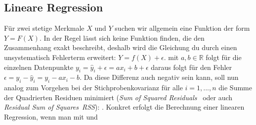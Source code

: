 \subsection{Lineare Regression}
Für zwei stetige Merkmale $X$ und $Y$ suchen wir allgemein eine Funktion der form $Y = F(X)$. In der Regel lässt sich keine Funktion finden, die den Zusammenhang exakt beschreibt, deshalb wird die Gleichung du durch einen unsystematisch Fehlerterm erweitert: $Y = f(X) + \epsilon$. mit $a, b \in \mathds{R}$ folgt für die einzelnen Datenpunkte $y_i = \hat{y}_i + \epsilon = ax_i + b + \epsilon$ daraus folgt für den Fehler $\epsilon = y_i - \hat{y}_i = y_i - ax_i - b$. Da diese Differenz auch negativ sein kann, soll nun analog zum Vorgehen bei der Stichprobenkovarianz für alle $i = 1, ..., n$ die Summe der Quadrierten Residuen minimiert (\glqq \emph{Sum of Squared Residuals}\grqq\  oder auch \glqq \emph{Residual Sum of Squares}\grqq\, \emph{RSS}): . Konkret erfolgt die Berechnung einer linearen Regression, wenn man  mit  und 
